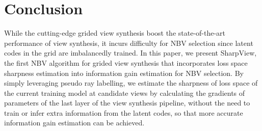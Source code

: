 \section{Conclusion\label{conclusion}}
While the cutting-edge grided view synthesis boost the state-of-the-art performance of view synthesis, it incurs difficulty for NBV selection since latent codes in the grid are imbalancedly trained.
In this paper, we present SharpView, the first NBV algorithm for grided view synthesis that incorporates loss space sharpness estimation into information gain estimation for NBV selection.
By simply leveraging pseudo ray labelling, we estimate the sharpness of loss space of the current training model at candidate views by calculating the gradients of parameters of the last layer of the view synthesis pipeline, without the need to train or infer extra information from the latent codes, so that more accurate information gain estimation can be achieved.
